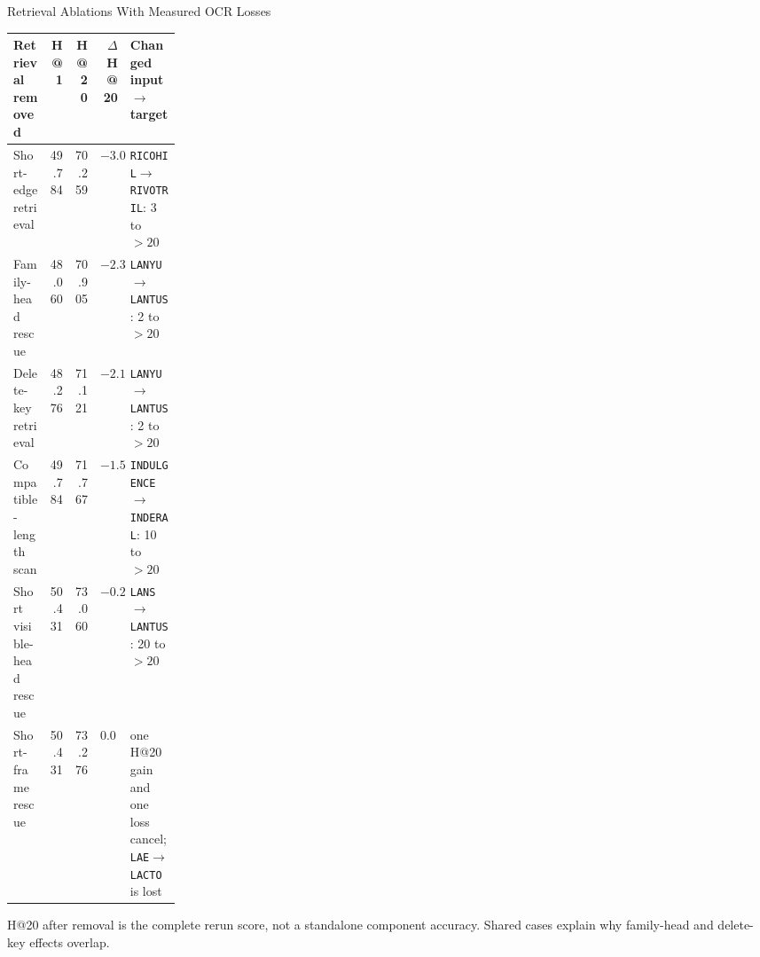 \documentclass[aspectratio=169,10pt]{beamer}
\newcommand{\code}[1]{\texttt{#1}}
\begin{document}
\begin{frame}{Retrieval Ablations With Measured OCR Losses}
\scriptsize
\begin{tabularx}{\linewidth}{@{}L{0.22\linewidth}rrrY@{}}
\toprule
\textbf{Retrieval removed} & \textbf{H@1} & \textbf{H@20} & \textbf{$\Delta$H@20} & \textbf{Changed input $\rightarrow$ target} \\
\midrule
Short-edge retrieval & 49.784 & 70.259 & $-3.017$ & \code{RICOHIL}$\rightarrow$\code{RIVOTRIL}: 3 to $>20$ \\
Family-head rescue & 48.060 & 70.905 & $-2.371$ & \code{LANYU}$\rightarrow$\code{LANTUS}: 2 to $>20$ \\
Delete-key retrieval & 48.276 & 71.121 & $-2.155$ & \code{LANYU}$\rightarrow$\code{LANTUS}: 2 to $>20$ \\
Compatible-length scan & 49.784 & 71.767 & $-1.509$ & \code{INDULGENCE}$\rightarrow$\code{INDERAL}: 10 to $>20$ \\
Short visible-head rescue & 50.431 & 73.060 & $-0.216$ & \code{LANS}$\rightarrow$\code{LANTUS}: 20 to $>20$ \\
Short-frame rescue & 50.431 & 73.276 & $0.000$ & one H@20 gain and one loss cancel; \code{LAE}$\rightarrow$\code{LACTO} is lost \\
\bottomrule
\end{tabularx}

H@20 after removal is the complete rerun score, not a standalone component
accuracy. Shared cases explain why family-head and delete-key effects overlap.
\end{frame}
\end{document}
